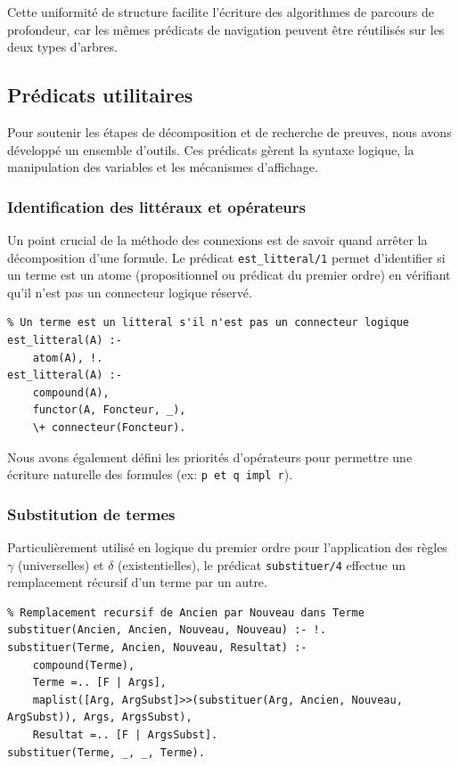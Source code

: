 \documentclass[12pt, a4paper]{article}
\begin{document}
Cette uniformité de structure facilite l'écriture des algorithmes de parcours de profondeur, car les mêmes prédicats de navigation peuvent être réutilisés sur les deux types d'arbres.

\subsection{Prédicats utilitaires}
Pour soutenir les étapes de décomposition et de recherche de preuves, nous avons développé un ensemble d'outils. Ces prédicats gèrent la syntaxe logique, la manipulation des variables et les mécanismes d'affichage.

\subsubsection{Identification des littéraux et opérateurs}

Un point crucial de la méthode des connexions est de savoir quand arrêter la décomposition d'une formule. Le prédicat \texttt{est\_litteral/1} permet d'identifier si un terme est un atome (propositionnel ou prédicat du premier ordre) en vérifiant qu'il n'est pas un connecteur logique réservé.

\begin{lstlisting}
% Un terme est un litteral s'il n'est pas un connecteur logique
est_litteral(A) :-
    atom(A), !.
est_litteral(A) :-
    compound(A),
    functor(A, Foncteur, _),
    \+ connecteur(Foncteur).
\end{lstlisting}

Nous avons également défini les priorités d'opérateurs pour permettre une écriture naturelle des formules (ex: \texttt{p et q impl r}).

\subsubsection{Substitution de termes}

Particulièrement utilisé en logique du premier ordre pour l'application des règles $\gamma$ (universelles) et $\delta$ (existentielles), le prédicat \texttt{substituer/4} effectue un remplacement récursif d'un terme par un autre. 

\begin{lstlisting}
% Remplacement recursif de Ancien par Nouveau dans Terme
substituer(Ancien, Ancien, Nouveau, Nouveau) :- !.
substituer(Terme, Ancien, Nouveau, Resultat) :-
    compound(Terme),
    Terme =.. [F | Args],
    maplist([Arg, ArgSubst]>>(substituer(Arg, Ancien, Nouveau, ArgSubst)), Args, ArgsSubst),
    Resultat =.. [F | ArgsSubst].
substituer(Terme, _, _, Terme).
\end{lstlisting}
\end{document}
